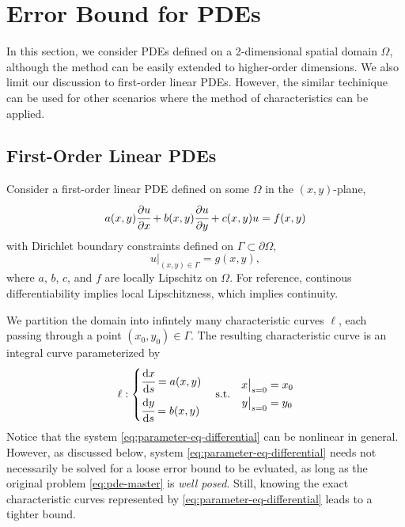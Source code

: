 \documentclass{article}
\newcommand{\px}[1]{\cfrac{\partial #1}{\partial x}}
\newcommand{\py}[1]{\cfrac{\partial #1}{\partial y}}
\newcommand{\ds}[1]{\cfrac{\mathrm{d} #1}{\mathrm{d} s}}
\begin{document}
\section{Error Bound for PDEs}
    In this section, we consider PDEs defined on a 2-dimensional spatial domain $\Omega$, although the method can be easily extended to higher-order dimensions. We also limit our discussion to first-order linear PDEs. However, the similar techinique can be used for other scenarios where the method of characteristics can be applied.

\subsection{First-Order Linear PDEs}
    Consider a first-order linear PDE defined on some $\Omega$ in the $(x, y)$-plane,
    \begin{equation}\label{eq:pde-master}
        a(x, y) \px{u} + b(x, y) \py{u} + c(x, y)u = f(x, y)
    \end{equation}
    with Dirichlet boundary constraints defined on $\Gamma \subset \partial \Omega$,
    \begin{equation}\label{eq:pde-bc-master}
        u\Big|_{(x, y) \in \Gamma} = g(x, y),
    \end{equation}
    where $a$, $b$, $c$, and $f$ are locally Lipschitz on $\Omega$. For reference, continous differentiability implies local Lipschitzness, which implies continuity.

    We partition the domain into infintely many characteristic curves $\ell$, each passing through a point $(x_0, y_0) \in \Gamma$. The resulting characteristic curve is an integral curve parameterized by
    \begin{equation} \label{eq:parameter-eq-differential}
        \ell: \begin{cases*}
            \ds{x} = a(x, y) \\
            \ds{y} = b(x, y) 
        \end{cases*} 
        \quad 
        \text{s.t.} 
        \quad
        \begin{aligned}
            x\big|_{s=0} &= x_0 \\
            y\big|_{s=0} &= y_0
        \end{aligned}
    \end{equation}
    Notice that the system \ref{eq:parameter-eq-differential} can be nonlinear in general. 
    However, as discussed below, system \ref{eq:parameter-eq-differential} needs not necessarily be solved for a loose error bound to be evluated, as long as the original problem \ref{eq:pde-master} is \textit{well posed}. 
    Still, knowing the exact characteristic curves represented by \ref{eq:parameter-eq-differential} leads to a tighter bound.
\end{document}
